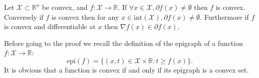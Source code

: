 \documentclass[openany]{now}
\newcommand{\R}{\mathbb{R}}
\begin{document}
\begin{proposition} \label{prop:existencesubgradients}
Let $\mathcal{X} \subset \R^n$ be convex, and $f : \mathcal{X} \rightarrow \R$. If $\forall x \in \mathcal{X}, \partial f(x) \neq \emptyset$ then $f$ is convex. Conversely if $f$ is convex then for any $x \in \mathrm{int}(\mathcal{X}), \partial f(x) \neq \emptyset$. Furthermore if $f$ is convex and differentiable at $x$ then $\nabla f(x) \in \partial f(x)$. 
\end{proposition}

Before going to the proof we recall the definition of the epigraph of a function $f : \mathcal{X} \rightarrow \R$:
$$\mathrm{epi}(f) = \{(x,t) \in \mathcal{X} \times \R : t \geq f(x) \} .$$
It is obvious that a function is convex if and only if its epigraph is a convex set.
\end{document}
